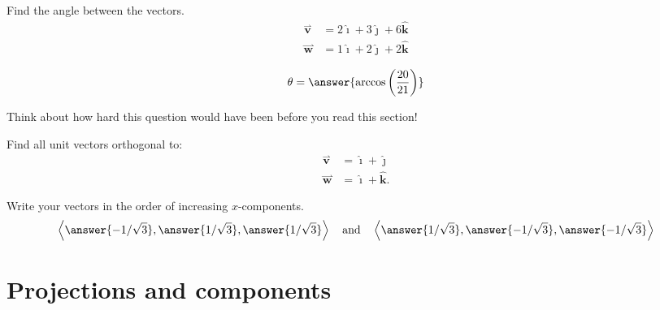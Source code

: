 \documentclass{ximera}
\begin{document}
\begin{question}
  Find the angle between the vectors.
  \begin{align*}
  \overset{\boldsymbol{\rightharpoonup}}{\mathbf{v}} &= 2\boldsymbol{\hat{\imath}}+3\boldsymbol{\hat{\jmath}}+6\boldsymbol{\hat{k}}\\
  \overset{\boldsymbol{\rightharpoonup}}{\mathbf{w}} &= 1\boldsymbol{\hat{\imath}}+2\boldsymbol{\hat{\jmath}}+2\boldsymbol{\hat{k}}
  \end{align*}
  \begin{prompt}
  \[
  \theta = \answer{ \arccos\left(\frac{20}{21}\right)}
  \]
  \end{prompt}
  \begin{feedback}
    Think about how hard this question would have been before you read this section!
  \end{feedback}
\end{question}


\begin{question}
  Find all unit vectors orthogonal to:
  \begin{align*}
    \overset{\boldsymbol{\rightharpoonup}}{\mathbf{v}} &= \boldsymbol{\hat{\imath}} + \boldsymbol{\hat{\jmath}}\\
    \overset{\boldsymbol{\rightharpoonup}}{\mathbf{w}} &= \boldsymbol{\hat{\imath}} + \boldsymbol{\hat{k}} .
  \end{align*}
  \begin{prompt}
    Write your vectors in the order of increasing $x$-components.
    \[
    \left\langle\answer{-1/\sqrt{3}},\answer{1/\sqrt{3}},\answer{1/\sqrt{3}} \right\rangle\quad\text{and}\quad \left\langle\answer{1/\sqrt{3}},\answer{-1/\sqrt{3}},\answer{-1/\sqrt{3}} \right\rangle
    \]
  \end{prompt}
\end{question}



\section{Projections and components}
\end{document}
